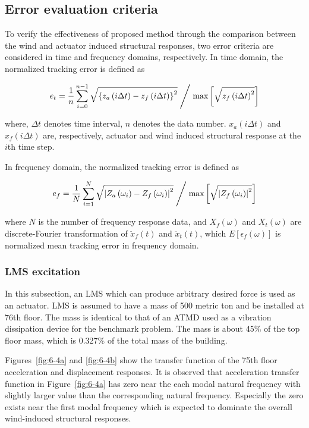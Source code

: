 \subsection{Error evaluation criteria}
To verify the effectiveness of proposed method through the comparison between the wind and actuator induced structural responses, two error criteria are considered in time and frequency domains, respectively.
In time domain, the normalized tracking error is defined as 

\begin{equation}\label{eq:6-8}
e_{t} = \frac{1}{n}\sum_{i=0}^{n-1}\sqrt{\left\{ z_{a} \left(i\Delta t \right) -z_{f}\left(i\Delta t\right) \right\}^{2}}  \Biggm/ \text{max} \left[\sqrt{z_{f}\left(i\Delta t\right)^{2}} \right]
\end{equation}

where, $\Delta t$ denotes time interval, $n$ denotes the data number. $x_{a}\left(i\Delta t\right)$ and $x_{f}\left(i\Delta t\right)$ are, respectively, actuator and wind induced structural response at the $i$th time step.

In frequency domain, the normalized tracking error is defined as

\begin{equation}\label{eq:6-9}
e_{f} = \frac{1}{N}\sum_{i=1}^{N}\sqrt{\left| Z_{a} \left(\omega_{i} \right) -Z_{f}\left(\omega_{i}\right) \right|^{2}} \Biggm/ \text{max} \left[\sqrt{\left|Z_{f}\left(\omega_{i}\right)\right|^{2}} \right]
\end{equation}

where $N$ is the number of frequency response data, and $X_{f}(\omega)$ and $X_{t}(\omega)$ are discrete-Fourier transformation of $\ddot{x}_{f}(t)$ and $\ddot{x}_{t}(t)$, which $E\left[\epsilon_{f}(\omega)\right]$ is normalized mean tracking error in frequency domain.

\subsubsection{LMS excitation}
In this subsection, an LMS which can produce arbitrary desired force is used as an actuator. LMS is assumed to have a mass of 500 metric ton and be installed at 76th floor. The mass is identical to that of an ATMD used as a vibration dissipation device for the benchmark problem. The mass is about 45\% of the top floor mass, which is 0.327\% of the total mass of the building.

Figures~\ref{fig:6-4a} and \ref{fig:6-4b} show the transfer function of the 75th floor acceleration and displacement responses. It is observed that acceleration transfer function in Figure~\ref{fig:6-4a} has zero near the each modal natural frequency with slightly larger value than the corresponding natural frequency. Especially the zero exists near the first modal frequency which is expected to dominate the overall wind-induced structural responses.

